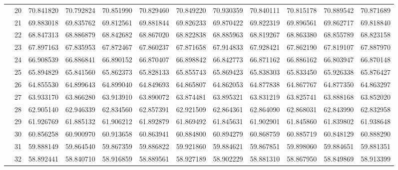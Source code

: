 \begin{table}[h]
{\begin{tabular}{cc|cccccccccc}
\multicolumn{1}{|c|}{} & 20 & 70.841820 & 70.792824 & 70.851990 & 70.829460 & 70.849220 & 70.930359 & 70.840111 & 70.815178 & 70.889542 & 70.871689 \\ \cline{2-2}
\multicolumn{1}{|c|}{} & 21 & 69.883018 & 69.835762 & 69.812561 & 69.881844 & 69.826233 & 69.870422 & 69.822319 & 69.896561 & 69.862717 & 69.818840 \\ \cline{2-2}
\multicolumn{1}{|c|}{} & 22 & 68.847313 & 68.886879 & 68.842682 & 68.867020 & 68.822838 & 68.885963 & 68.819267 & 68.863380 & 68.855789 & 68.823158 \\ \cline{2-2}
\multicolumn{1}{|c|}{} & 23 & 67.897163 & 67.835953 & 67.872467 & 67.860237 & 67.871658 & 67.914833 & 67.928421 & 67.862190 & 67.819107 & 67.887970 \\ \cline{2-2}
\multicolumn{1}{|c|}{} & 24 & 66.908539 & 66.886841 & 66.890152 & 66.870407 & 66.898842 & 66.842773 & 66.871162 & 66.886162 & 66.803947 & 66.870148 \\ \cline{2-2}
\multicolumn{1}{|c|}{} & 25 & 65.894829 & 65.841560 & 65.862373 & 65.828133 & 65.855743 & 65.869423 & 65.838303 & 65.833450 & 65.926338 & 65.876427 \\ \cline{2-2}
\multicolumn{1}{|c|}{} & 26 & 64.855530 & 64.899643 & 64.899040 & 64.849693 & 64.865807 & 64.862053 & 64.877838 & 64.867767 & 64.877350 & 64.863297 \\ \cline{2-2}
\multicolumn{1}{|c|}{} & 27 & 63.933170 & 63.866280 & 63.913910 & 63.890072 & 63.874481 & 63.895321 & 63.831219 & 63.825741 & 63.888168 & 63.852020 \\ \cline{2-2}
\multicolumn{1}{|c|}{} & 28 & 62.905140 & 62.946339 & 62.834560 & 62.857391 & 62.921509 & 62.864361 & 62.864090 & 62.868031 & 62.843990 & 62.832958 \\ \cline{2-2}
\multicolumn{1}{|c|}{} & 29 & 61.926769 & 61.885132 & 61.906212 & 61.892879 & 61.869492 & 61.845631 & 61.902901 & 61.845860 & 61.839802 & 61.938648 \\ \cline{2-2}
\multicolumn{1}{|c|}{} & 30 & 60.856258 & 60.900970 & 60.913658 & 60.863941 & 60.884800 & 60.894279 & 60.868759 & 60.885719 & 60.848129 & 60.888290 \\ \cline{2-2}
\multicolumn{1}{|c|}{} & 31 & 59.888149 & 59.864540 & 59.867359 & 59.886822 & 59.921860 & 59.884621 & 59.867851 & 59.898060 & 59.884651 & 59.881351 \\ \cline{2-2}
\multicolumn{1}{|c|}{} & 32 & 58.892441 & 58.840710 & 58.916859 & 58.889561 & 58.927189 & 58.902229 & 58.881310 & 58.867950 & 58.849869 & 58.913399 \\ \cline{2-2}

\end{tabular}}
\end{table}
